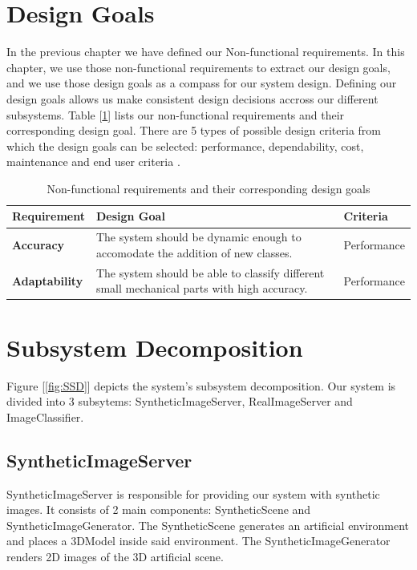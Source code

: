 \documentclass[a4paper,12pt,twoside]{report}
\begin{document}
\section{Design Goals}

In the previous chapter we have defined our Non-functional requirements. In this chapter, we use those non-functional requirements to extract our design goals, and we use those design goals as a compass for our system design. Defining our design goals allows us make consistent design decisions accross our different subsystems. Table [\ref{tab:DG}] lists our non-functional requirements and their corresponding design goal. There are 5 types of possible design criteria from which the design goals can be selected: performance, dependability, cost, maintenance and end user criteria \cite{bruegge2004object}.

\begin{table}
  \centering
  \begin{tabular}{ | l | p{5cm} | l | }
    \hline
    \textbf{Requirement} & \textbf{Design Goal} & \textbf{Criteria} \\ \hline
    \textbf{Accuracy} & The system should be dynamic enough to accomodate the addition of new classes. & Performance \\ \hline
    \textbf{Adaptability} & The system should be able to classify different small mechanical parts with high accuracy. & Performance \\ \hline
  \end{tabular}
  \caption{Non-functional requirements and their corresponding design goals}
  \label{tab:DG}
\end{table}

\section{Subsystem Decomposition}

Figure [\ref{fig:SSD}] depicts the system's subsystem decomposition. Our system is divided into 3 subsytems: SyntheticImageServer, RealImageServer and ImageClassifier.

\subsection{SyntheticImageServer}
SyntheticImageServer is responsible for providing our system with synthetic images. It consists of 2 main components: SyntheticScene and SyntheticImageGenerator. The SyntheticScene generates an artificial environment and places a 3DModel inside said environment. The SyntheticImageGenerator renders 2D images of the 3D artificial scene.
\end{document}
